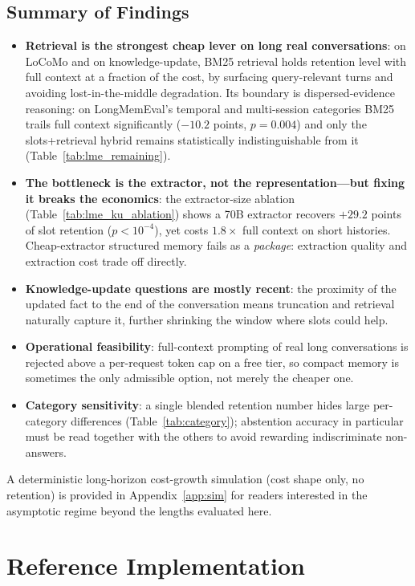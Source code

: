 \documentclass[conference]{IEEEtran}
\begin{document}
\subsection{Summary of Findings}
\begin{itemize}
    \item \textbf{Retrieval is the strongest cheap lever on long real conversations}: on LoCoMo and on knowledge-update, BM25 retrieval holds retention level with full context at a fraction of the cost, by surfacing query-relevant turns and avoiding lost-in-the-middle degradation. Its boundary is dispersed-evidence reasoning: on LongMemEval's temporal and multi-session categories BM25 trails full context significantly ($-10.2$ points, $p=0.004$) and only the slots+retrieval hybrid remains statistically indistinguishable from it (Table~\ref{tab:lme_remaining}).
    \item \textbf{The bottleneck is the extractor, not the representation---but fixing it breaks the economics}: the extractor-size ablation (Table~\ref{tab:lme_ku_ablation}) shows a 70B extractor recovers $+29.2$ points of slot retention ($p<10^{-4}$), yet costs $1.8\times$ full context on short histories. Cheap-extractor structured memory fails as a \emph{package}: extraction quality and extraction cost trade off directly.
    \item \textbf{Knowledge-update questions are mostly recent}: the proximity of the updated fact to the end of the conversation means truncation and retrieval naturally capture it, further shrinking the window where slots could help.
    \item \textbf{Operational feasibility}: full-context prompting of real long conversations is rejected above a per-request token cap on a free tier, so compact memory is sometimes the only admissible option, not merely the cheaper one.
    \item \textbf{Category sensitivity}: a single blended retention number hides large per-category differences (Table~\ref{tab:category}); abstention accuracy in particular must be read together with the others to avoid rewarding indiscriminate non-answers.
\end{itemize}

A deterministic long-horizon cost-growth simulation (cost shape only, no retention) is provided in Appendix~\ref{app:sim} for readers interested in the asymptotic regime beyond the lengths evaluated here.

\section{Reference Implementation}
\label{sec:implementation}
\end{document}
